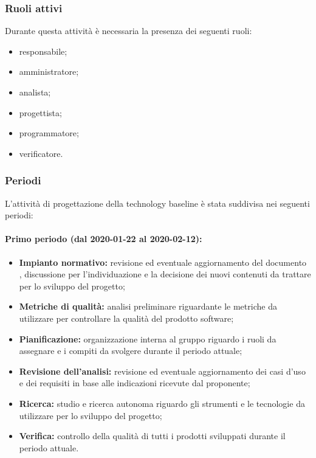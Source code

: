 			\subsubsection{Ruoli attivi}
			
				Durante questa attività è necessaria la presenza dei seguenti ruoli:
				\begin{itemize}
					\item responsabile;
					\item amministratore;
					\item analista;
					\item progettista;
					\item programmatore;
					\item verificatore.
				\end{itemize}
			
			\subsubsection{Periodi}
			
				L'attività di progettazione della technology baseline è stata suddivisa nei seguenti periodi:
				
				\paragraph{Primo periodo (dal 2020-01-22 al 2020-02-12):}
				
					\begin{itemize}
					 	\item \textbf{Impianto normativo:} revisione ed eventuale aggiornamento del documento , discussione per l'individuazione e la decisione dei nuovi contenuti da trattare per lo sviluppo del progetto;
					 	\item \textbf{Metriche di qualità:} analisi preliminare riguardante le metriche da utilizzare per controllare la qualità del prodotto software;
					 	\item \textbf{Pianificazione:} organizzazione interna al gruppo riguardo i ruoli da assegnare e i compiti da svolgere durante il periodo attuale;
					 	\item \textbf{Revisione dell'analisi:} revisione ed eventuale aggiornamento dei casi d'uso e dei requisiti in base alle indicazioni ricevute dal proponente;
					 	\item \textbf{Ricerca:} studio e ricerca autonoma riguardo gli strumenti e le tecnologie da utilizzare per lo sviluppo del progetto;
					 	\item \textbf{Verifica:} controllo della qualità di tutti i prodotti sviluppati durante il periodo attuale.
					\end{itemize} 	
				
